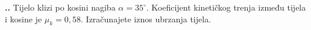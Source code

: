 

\noindent 
\textbf{
\thecjelina.\thezadatak.}
Tijelo klizi po kosini nagiba $\alpha=35^\circ$. Koeficijent kinetičkog trenja između tijela i kosine je $\mu_k=0,58$.
Izračunajete iznos ubrzanja tijela.

